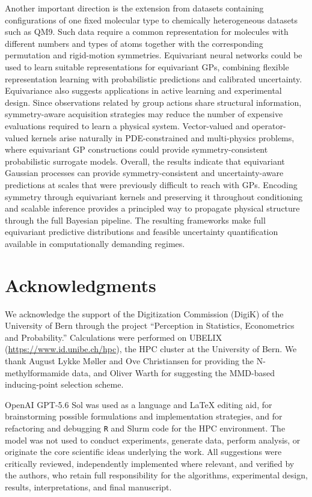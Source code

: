\documentclass[11pt,a4paper]{article}
\begin{document}
Another important direction is the extension from datasets containing configurations of one fixed molecular type to chemically heterogeneous datasets such as QM9. Such data require a common representation for molecules with different numbers and types of atoms together with the corresponding permutation and rigid-motion symmetries. Equivariant neural networks could be used to learn suitable representations for equivariant GPs, combining flexible representation learning with probabilistic predictions and calibrated uncertainty. Equivariance also suggests applications in active learning and experimental design. Since observations related by group actions share structural information, symmetry-aware acquisition strategies may reduce the number of expensive evaluations required to learn a physical system. Vector-valued and operator-valued kernels arise naturally in PDE-constrained and multi-physics problems, where equivariant GP constructions could provide symmetry-consistent probabilistic surrogate models. Overall, the results indicate that equivariant Gaussian processes can provide symmetry-consistent and uncertainty-aware predictions at scales that were previously difficult to reach with GPs. Encoding symmetry through equivariant kernels and preserving it throughout conditioning and scalable inference provides a principled way to propagate physical structure through the full Bayesian pipeline. The resulting frameworks make full equivariant predictive distributions and feasible uncertainty quantification available in computationally demanding regimes.

\section*{Acknowledgments}
We acknowledge the support of the Digitization Commission (DigiK) of the University of Bern through the project ``Perception in Statistics, Econometrics and Probability.'' Calculations were performed on UBELIX (\url{https://www.id.unibe.ch/hpc}), the HPC cluster at the University of Bern. We thank August Lykke M{\o}ller and Ove Christiansen for providing the N-methylformamide data, and Oliver Warth for suggesting the MMD-based inducing-point selection scheme.

OpenAI GPT-5.6 Sol was used as a language and \LaTeX{} editing aid, for brainstorming possible formulations and implementation strategies, and for refactoring and debugging \texttt{R} and Slurm code for the HPC environment. The model was not used to conduct experiments, generate data, perform analysis, or originate the core scientific ideas underlying the work.
All suggestions were critically reviewed, independently implemented where relevant, and verified by the authors, who retain full responsibility for the algorithms, experimental design, results, interpretations, and final manuscript.
\end{document}
